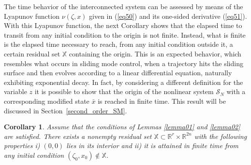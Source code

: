 \documentclass[twocolumn]{autarc_LH}
\newcommand{\Rf}{{\mathbb R}}
\newtheorem{corollary}{Corollary}
\begin{document}
The time behavior of the interconnected system can be assessed by means of the Lyapunov function $\nu(\zeta,x)$ given in (\ref{eq50}) and its one-sided derivative (\ref{eq51}). With this Lyapunov function, the next Corollary shows that the elapsed time to transit from any initial condition to the origin is not finite. Instead, what is finite is the elapsed time necessary to reach, from any initial condition outside it, a certain residual set $\mathbb{X}$ containing the origin. This is an expected behavior, 
which resembles what occurs in sliding mode control, when a trajectory hits the sliding surface and 
then evolves according to a linear differential equation, naturally exhibiting exponential decay. In fact, by considering a different definition for the variable $z$ it is possible to show that the origin of the nonlinear system $\mathcal{S}_{N}$ with a corresponding modified state $\bar x$ is reached in finite time. This result will be discussed in Section~\ref{second_order_SM}.
\begin{corollary} \label{corollary1}
Assume that the conditions of Lemmas \ref{lemma01} and \ref{lemma02} are satisfied. There exists a nonempty residual set $\mathbb{X} \subset \Rf^{r} \times \Rf^{2n}$ with the following properties i) $(0,0)$ lies in its interior and ii) it is attained in finite time from any initial condition $(\zeta_0, x_0) \notin \mathbb{X}$.  
\end{corollary}
\end{document}
